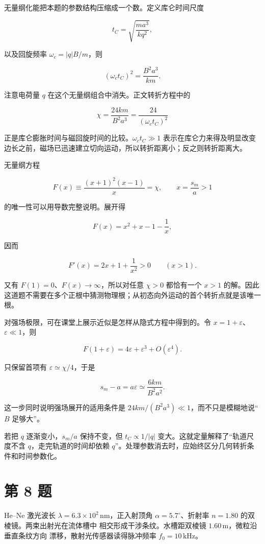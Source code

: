 \documentclass[12pt,a4paper,UTF8]{ctexart}
\begin{document}
无量纲化能把本题的参数结构压缩成一个数。定义库仑时间尺度

\[
t_C=\sqrt{\frac{ma^3}{kq^2}},
\]

以及回旋频率 \(\omega_c=|q|B/m\)，则

\[
(\omega_ct_C)^2
=\frac{B^2a^3}{km}.
\]

注意电荷量 \(q\) 在这个无量纲组合中消失。正文转折方程中的

\[
\chi=\frac{24km}{B^2a^3}
=\frac{24}{(\omega_ct_C)^2}
\]

正是库仑膨胀时间与磁回旋时间的比较。\(\omega_ct_C\gg1\)
表示在库仑力来得及明显改变边长之前，磁场已迅速建立切向运动，所以转折距离小；反之则转折距离大。

无量纲方程

\[
F(x)\equiv\frac{(x+1)^2(x-1)}{x}=\chi,
\qquad x=\frac{s_m}{a}>1
\]

的唯一性可以用导数完整说明。展开得

\[
F(x)=x^2+x-1-\frac1x,
\]

因而

\[
F'(x)=2x+1+\frac1{x^2}>0
\qquad(x>1).
\]

又有 \(F(1)=0\)、\(F(x)\to\infty\)，所以对任意 \(\chi>0\) 都恰有一个
\(x>1\)
的解。因此这道题不需要在多个正根中猜测物理根；从初态向外运动的首个转折点就是该唯一根。

对强场极限，可在课堂上展示近似是怎样从隐式方程中得到的。令
\(x=1+\varepsilon\)、\(\varepsilon\ll1\)，则

\[
F(1+\varepsilon)
=4\varepsilon+\varepsilon^3+O(\varepsilon^4).
\]

只保留首项有 \(\varepsilon\simeq\chi/4\)，于是

\[
s_m-a=a\varepsilon
\simeq\frac{6km}{B^2a^2}.
\]

这一步同时说明强场展开的适用条件是
\(24km/(B^2a^3)\ll1\)，而不只是模糊地说``\(B\) 足够大''。

若把 \(q\) 逐渐变小，\(s_m/a\) 保持不变，但 \(t_C\propto1/|q|\)
变大。这就定量解释了``轨道尺度不含 \(q\)，走完轨道的时间却依赖
\(q\)''。处理参数消去时，应始终区分几何转折条件和时间参数化。

\newpage

\section{第 8 题}\label{ux7b2c-8-ux9898}

He--Ne 激光波长 \(\lambda=6.3\times10^2\,\mathrm{nm}\)，正入射顶角
\(\alpha=5.7^\circ\)、折射率 \(n=1.80\) 的双棱镜。两束出射光在流体槽中
相交形成干涉条纹。水槽距双棱镜 \(1.60\,\mathrm m\)，微粒沿垂直条纹方向
漂移，散射光传感器读得脉冲频率 \(f_0=10\,\mathrm{kHz}\)。
\end{document}
